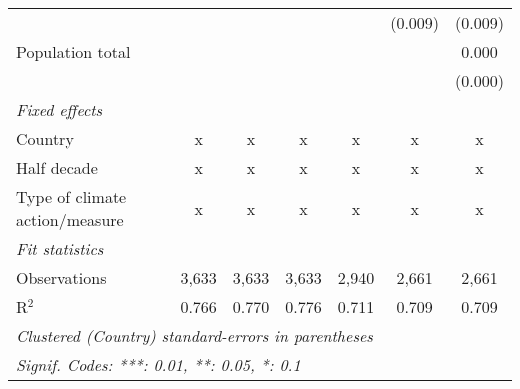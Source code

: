 \begin{tabular}{lcccccc}
                                                                              &               &               &               &               & (0.009)       & (0.009)\\   
   Population total                                                           &               &               &               &               &               & 0.000\\   
                                                                              &               &               &               &               &               & (0.000)\\   
   \emph{Fixed effects}\\
   Country                                                                    & x             & x             & x             & x             & x             & x\\  
   Half decade                                                                & x             & x             & x             & x             & x             & x\\  
   Type of climate action/measure                                             & x             & x             & x             & x             & x             & x\\  
   \midrule \emph{Fit statistics}\\
   Observations                                                               & 3,633         & 3,633         & 3,633         & 2,940         & 2,661         & 2,661\\  
   R$^2$                                                                      & 0.766         & 0.770         & 0.776         & 0.711         & 0.709         & 0.709\\  
   \midrule
   \multicolumn{7}{l}{\emph{Clustered (Country) standard-errors in parentheses}}\\
   \multicolumn{7}{l}{\emph{Signif. Codes: ***: 0.01, **: 0.05, *: 0.1}}\\
\end{tabular}
\par\endgroup


